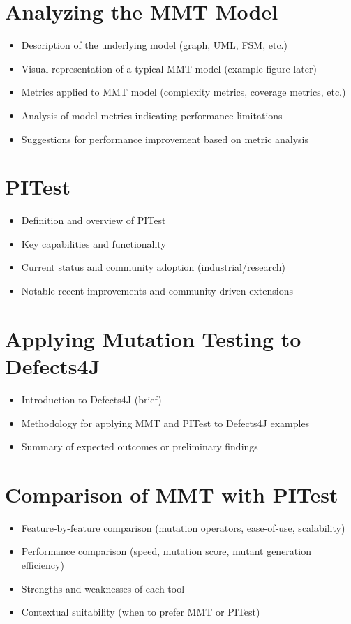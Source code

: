 \documentclass[sigplan, nonacm]{acmart}
\begin{document}
\section{Analyzing the MMT Model}
\begin{itemize}
    \item Description of the underlying model (graph, UML, FSM, etc.)
    \item Visual representation of a typical MMT model (example figure later)
    \item Metrics applied to MMT model (complexity metrics, coverage metrics, etc.)
    \item Analysis of model metrics indicating performance limitations
    \item Suggestions for performance improvement based on metric analysis
\end{itemize}

\section{PITest}
\begin{itemize}
    \item Definition and overview of PITest
    \item Key capabilities and functionality
    \item Current status and community adoption (industrial/research)
    \item Notable recent improvements and community-driven extensions
\end{itemize}

\section{Applying Mutation Testing to Defects4J}
\begin{itemize}
    \item Introduction to Defects4J (brief)
    \item Methodology for applying MMT and PITest to Defects4J examples
    \item Summary of expected outcomes or preliminary findings
\end{itemize}

\section{Comparison of MMT with PITest}
\begin{itemize}
    \item Feature-by-feature comparison (mutation operators, ease-of-use, scalability)
    \item Performance comparison (speed, mutation score, mutant generation efficiency)
    \item Strengths and weaknesses of each tool
    \item Contextual suitability (when to prefer MMT or PITest)
\end{itemize}
\end{document}

